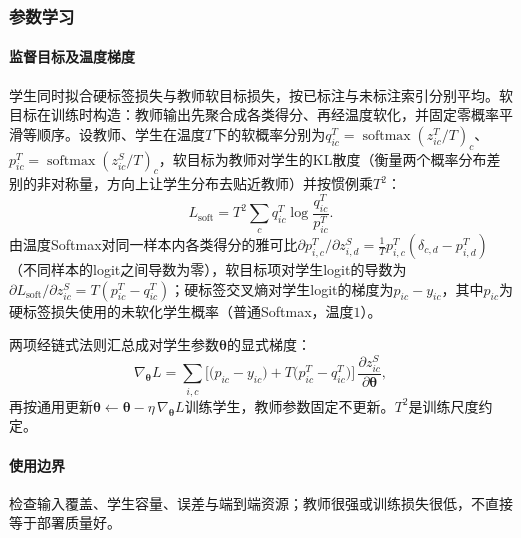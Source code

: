 \subsubsection{参数学习}

\paragraph{监督目标及温度梯度}
学生同时拟合硬标签损失与教师软目标损失，按已标注与未标注索引分别平均。软目标在训练时构造：教师输出先聚合成各类得分、再经温度软化，并固定零概率平滑等顺序。设教师、学生在温度$T$下的软概率分别为$q_{ic}^T=\operatorname{softmax}(z_{ic}^T/T)_c$、$p_{ic}^T=\operatorname{softmax}(z_{ic}^S/T)_c$，软目标为教师对学生的KL散度（衡量两个概率分布差别的非对称量，方向上让学生分布去贴近教师）并按惯例乘$T^2$：
\begin{equation}
  L_{\mathrm{soft}}=T^2\sum_c q_{ic}^T\log\frac{q_{ic}^T}{p_{ic}^T}.
  \label{eq:ensemble-distill-kl}
\end{equation}
由温度Softmax对同一样本内各类得分的雅可比$\partial p_{i,c}^T/\partial z_{i,d}^S=\frac1T p_{i,c}^T(\delta_{c,d}-p_{i,d}^T)$（不同样本的logit之间导数为零），软目标项对学生logit的导数为$\partial L_{\mathrm{soft}}/\partial z_{ic}^S=T(p_{ic}^T-q_{ic}^T)$；硬标签交叉熵对学生logit的梯度为$p_{ic}-y_{ic}$，其中$p_{ic}$为硬标签损失使用的未软化学生概率（普通Softmax，温度$1$）。

两项经链式法则汇总成对学生参数$\bm\theta$的显式梯度：
\begin{equation}
  \nabla_{\bm\theta}L
  =\sum_{i,c}\Big[\big(p_{ic}-y_{ic}\big)+T\big(p_{ic}^T-q_{ic}^T\big)\Big]\,\frac{\partial z_{ic}^S}{\partial\bm\theta},
  \label{eq:ensemble-distill-theta-grad}
\end{equation}
再按通用更新$\bm\theta\leftarrow\bm\theta-\eta\,\nabla_{\bm\theta}L$训练学生，教师参数固定不更新。$T^2$是训练尺度约定。

\paragraph{使用边界}
检查输入覆盖、学生容量、误差与端到端资源；教师很强或训练损失很低，不直接等于部署质量好。
